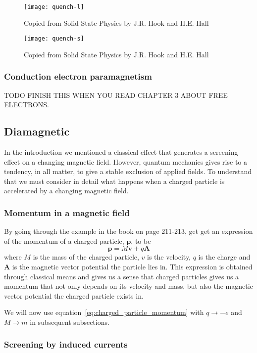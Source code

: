 \documentclass[11pt]{article}
\begin{document}
\begin{figure}[!h]
	\centering
	\texttt{[image: quench-l]}
	\caption{Copied from Solid State Physics by J.R. Hook and H.E. Hall}
	\label{fig:quench-l}
\end{figure}

\begin{figure}[!h]
	\centering
	\texttt{[image: quench-s]}
	\caption{Copied from Solid State Physics by J.R. Hook and H.E. Hall}
	\label{fig:quench-s}
\end{figure}

\newpage
\subsubsection{Conduction electron paramagnetism}
TODO
FINISH THIS WHEN YOU READ CHAPTER 3 ABOUT FREE ELECTRONS.


\newpage
\subsection{Diamagnetic}
In the introduction we mentioned a classical effect that generates a screening effect on a changing magnetic field. However, quantum mechanics gives rise to a tendency, in all matter, to give a stable exclusion of applied fields. To understand that we must consider in detail what happens when a charged particle is accelerated by a changing magnetic field.

\subsubsection{Momentum in a magnetic field}
By going through the example in the book on page 211-213, get get an expression of the momentum of a charged particle, $\pmb{p}$, to be
\begin{equation}
	\pmb{p} = M\pmb{v} + q\pmb{A}
	\label{eq:charged_particle_momentum}
\end{equation}
where $M$ is the mass of the charged particle, $v$ is the velocity, $q$ is the charge and $\pmb{A}$ is the magnetic vector potential the particle lies in. This expression is obtained through classical means and gives us a sense that charged particles gives us a momentum that not only depends on its velocity and mass, but also the magnetic vector potential the charged particle exists in.

We will now use equation~\ref{eq:charged_particle_momentum} with $q \to -e$ and $M \to m$ in subsequent subsections.
\subsubsection{Screening by induced currents}
\end{document}
